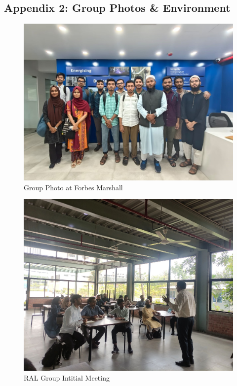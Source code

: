 \documentclass[12pt]{article}
\begin{document}
\begin{appendices}
    \section{Appendix 2: Group Photos \& Environment}
    \begin{figure}[h!]
        \centering
        \includegraphics[width=0.8\linewidth]{figs/group_pic_fm.jpg}
        \caption{Group Photo at Forbes Marshall}
        \label{fig:group_pic_fm}
    \end{figure}
    
    \begin{figure}[h!]
        \centering
        \includegraphics[width=0.8\linewidth]{figs/RAL_initial_meeting.jpg}
        \caption{RAL Group Intitial Meeting}
        \label{fig:RAL Group Intitial Meeting}
    \end{figure}


\end{appendices}
\end{document}
